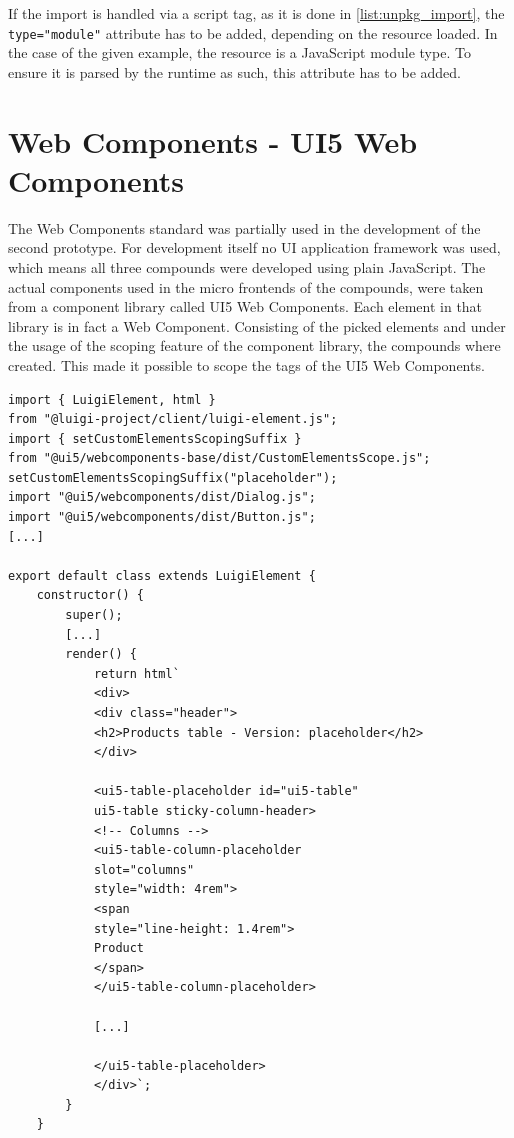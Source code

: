 If the import is handled via a script tag, as it is done in \ref{list:unpkg_import}, the \texttt{type="module"} attribute has to be added, depending on the resource loaded.
In the case of the given example, the resource is a JavaScript module type. To ensure it is parsed by the runtime as such, this attribute has to be added.\cite{js_module_type}

\section{Web Components - UI5 Web Components} 

The Web Components standard was partially used in the development of the second prototype. For development itself no UI application framework was used, which means all three compounds were developed using plain JavaScript. The actual components used in the micro frontends of the compounds, were taken from a component library called UI5 Web Components. Each element in that library is in fact a Web Component.\cite{ui5_wc_github}
Consisting of the picked elements and under the usage of the scoping feature of the component library, the compounds where created. This made it possible to scope the tags of the UI5 Web Components.\cite{ui5_webcomponents_scoping}

\begin{lstlisting}[caption=Scoping feature used in the prototype, label=list:scoping_wc_prototype,  xleftmargin=.0\textwidth, xrightmargin=.0\textwidth]
import { LuigiElement, html } 
from "@luigi-project/client/luigi-element.js";
import { setCustomElementsScopingSuffix } 
from "@ui5/webcomponents-base/dist/CustomElementsScope.js";
setCustomElementsScopingSuffix("placeholder");
import "@ui5/webcomponents/dist/Dialog.js";
import "@ui5/webcomponents/dist/Button.js";
[...]

export default class extends LuigiElement {
	constructor() {
		super();
		[...]
		render() {
			return html`
			<div>
			<div class="header">
			<h2>Products table - Version: placeholder</h2>
			</div>
			
			<ui5-table-placeholder id="ui5-table" 
			ui5-table sticky-column-header>
			<!-- Columns -->
			<ui5-table-column-placeholder 
			slot="columns" 
			style="width: 4rem">
			<span 
			style="line-height: 1.4rem">
			Product
			</span>
			</ui5-table-column-placeholder>
			
			[...]
			
			</ui5-table-placeholder>
			</div>`;
		}
	}
\end{lstlisting}
	
